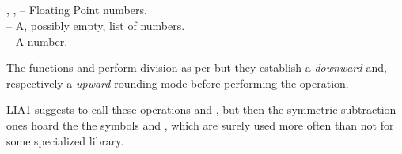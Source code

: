 \documentclass[../Arithmetic-Operations.tex]{subfiles}
\begin{document}


   \RArrow {}\\
   \RArrow {}\\
   \RArrow \varname {}\\
   \RArrow \varname {}\\

\DArgsNValues{}

, ,  -- Floating Point numbers.\\
 -- A, possibly empty, list of numbers.\\
 -- A number.

\DDescription{}

The functions   and  perform division as per \code{/}
but they establish a \emph{downward} and, respectively a
\emph{upward} rounding mode before performing the operation.

\DNotes{}

LIA1 suggests to call these operations \code{</} and \code{/>}, but
then the symmetric subtraction ones hoard the the symbols \code{<-}
and \code{->}, which are surely used more often than not for some
specialized library.
\end{document}
